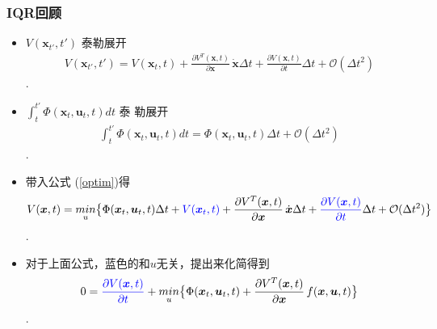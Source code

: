 \documentclass[UTF8, aspectratio=169, 9pt]{ctexbeamer}
\begin{document}
\begin{frame}
  \frametitle{IQR回顾}
  \begin{itemize}
  \item $V( \boldsymbol{x}_{t'}, t' )$ 泰勒展开
    \begin{align}
      V( \boldsymbol{x}_{t'}, t' ) = V( \boldsymbol{x}_{t}, t ) + \frac{
      \partial V^T ( \boldsymbol{x}, t  ) } { \partial
      \boldsymbol{x}  } \, \dot { \boldsymbol{x} }  \Delta t + \frac{ \partial V
      ( \boldsymbol{x}, t )}{ \partial t } \Delta t + \mathcal{O} ( \Delta t^2 )
    \end{align}.
  \item $      \int_t^{t'}\Phi( \boldsymbol{x}_t,  \boldsymbol{u}_t, t ) dt$ 泰
    勒展开
    \begin{align}
            \int_t^{t'}\Phi( \boldsymbol{x}_t,  \boldsymbol{u}_t, t ) dt = \Phi(
      \boldsymbol{x}_t,  \boldsymbol{u}_t, t ) \Delta t + \mathcal{O} (\Delta
      t^2 )
    \end{align}.
  \item 带入公式 (\ref{optim})得
    \begin{align}
      V( \boldsymbol{x}, t ) = \underset{u}{min} \big \{
      \Phi(
      \boldsymbol{x}_t,  \boldsymbol{u}_t, t ) \Delta t + \textcolor{blue} { V(
      \boldsymbol{x}_{t}, t ) } + \frac{
      \partial V^T ( \boldsymbol{x}, t  ) } { \partial
      \boldsymbol{x}  } \, \dot { \boldsymbol{x} }  \Delta t + \textcolor{blue} { \frac{ \partial V
      ( \boldsymbol{x}, t )}{ \partial t } } \Delta t
      + \mathcal{O} (\Delta
      t^2 )
      \big \}
    \end{align}.
  \item 对于上面公式，蓝色的和$u$无关，提出来化简得到
    \begin{align}
      \label{hjb}
      0 = \textcolor{blue} { \frac{ \partial V
      ( \boldsymbol{x}, t )}{ \partial t } }  +
      \underset{u}{min} \big \{
      \Phi(
      \boldsymbol{x}_t,  \boldsymbol{u}_t, t )  + \frac{
      \partial V^T ( \boldsymbol{x}, t  ) } { \partial
      \boldsymbol{x}  } \, f(\boldsymbol{x}, \boldsymbol{u}, t)
      \big \}
    \end{align}.

  \end{itemize}
\end{frame}
\end{document}
